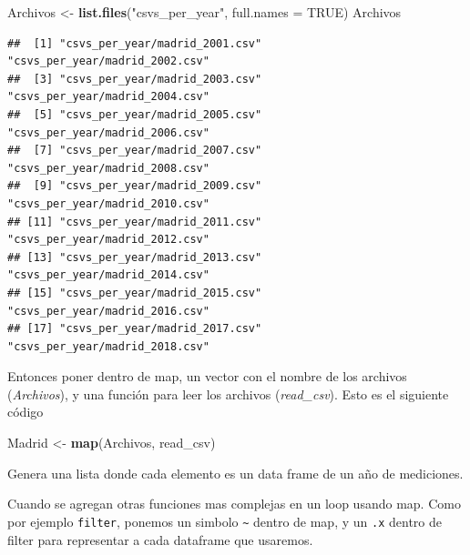 \documentclass[]{book}
\newenvironment{Shaded}{\begin{snugshade}}{\end{snugshade}}
\newcommand{\DataTypeTok}[1]{\textcolor[rgb]{0.13,0.29,0.53}{#1}}
\newcommand{\DecValTok}[1]{\textcolor[rgb]{0.00,0.00,0.81}{#1}}
\newcommand{\KeywordTok}[1]{\textcolor[rgb]{0.13,0.29,0.53}{\textbf{#1}}}
\newcommand{\NormalTok}[1]{#1}
\newcommand{\OperatorTok}[1]{\textcolor[rgb]{0.81,0.36,0.00}{\textbf{#1}}}
\newcommand{\OtherTok}[1]{\textcolor[rgb]{0.56,0.35,0.01}{#1}}
\newcommand{\StringTok}[1]{\textcolor[rgb]{0.31,0.60,0.02}{#1}}
\begin{document}
\begin{Shaded}
\begin{Highlighting}[]
\NormalTok{Archivos <-}\StringTok{ }\KeywordTok{list.files}\NormalTok{(}\StringTok{"csvs_per_year"}\NormalTok{, }\DataTypeTok{full.names =} \OtherTok{TRUE}\NormalTok{)}
\NormalTok{Archivos}
\end{Highlighting}
\end{Shaded}

\begin{verbatim}
##  [1] "csvs_per_year/madrid_2001.csv" "csvs_per_year/madrid_2002.csv"
##  [3] "csvs_per_year/madrid_2003.csv" "csvs_per_year/madrid_2004.csv"
##  [5] "csvs_per_year/madrid_2005.csv" "csvs_per_year/madrid_2006.csv"
##  [7] "csvs_per_year/madrid_2007.csv" "csvs_per_year/madrid_2008.csv"
##  [9] "csvs_per_year/madrid_2009.csv" "csvs_per_year/madrid_2010.csv"
## [11] "csvs_per_year/madrid_2011.csv" "csvs_per_year/madrid_2012.csv"
## [13] "csvs_per_year/madrid_2013.csv" "csvs_per_year/madrid_2014.csv"
## [15] "csvs_per_year/madrid_2015.csv" "csvs_per_year/madrid_2016.csv"
## [17] "csvs_per_year/madrid_2017.csv" "csvs_per_year/madrid_2018.csv"
\end{verbatim}

Entonces poner dentro de map, un vector con el nombre de los archivos
(\emph{Archivos}), y una función para leer los archivos
(\emph{read\_csv}). Esto es el siguiente código

\begin{Shaded}
\begin{Highlighting}[]
\NormalTok{Madrid <-}\StringTok{ }\KeywordTok{map}\NormalTok{(Archivos, read_csv)}
\end{Highlighting}
\end{Shaded}

Genera una lista donde cada elemento es un data frame de un año de
mediciones.

Cuando se agregan otras funciones mas complejas en un loop usando map.
Como por ejemplo \texttt{filter}, ponemos un simbolo
\texttt{\textasciitilde{}} dentro de map, y un \texttt{.x} dentro de
filter para representar a cada dataframe que usaremos.

\begin{Shaded}
\end{Shaded}
\end{document}
